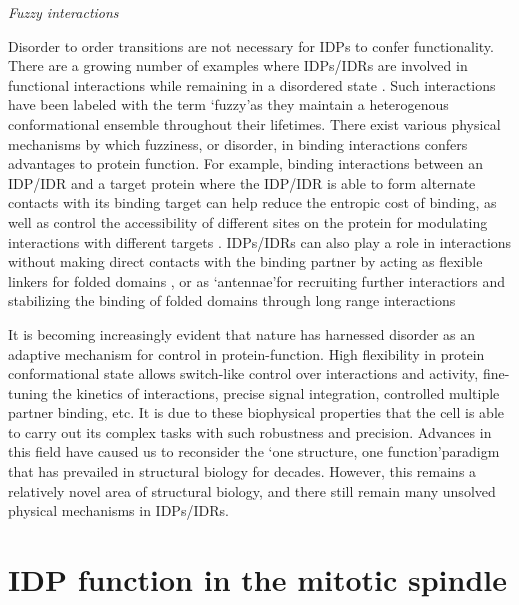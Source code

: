{\it Fuzzy interactions}

\par Disorder to order transitions are not necessary for IDPs to confer functionality. There are a growing number of examples where IDPs/IDRs are involved in functional interactions while remaining in a disordered state \cite{tompa2008fuzzy}. Such interactions have been labeled with the term \lq fuzzy\rq as they maintain a heterogenous conformational ensemble throughout their lifetimes. There exist various physical mechanisms by which fuzziness, or disorder, in binding interactions confers advantages to protein function. For example, binding interactions between an IDP/IDR and a target protein where the IDP/IDR is able to form alternate contacts with its binding target can help reduce the entropic cost of binding, as well as control the accessibility of different sites on the protein for modulating interactions with different targets \cite{graham2001tcf4, fontes2000structural}. IDPs/IDRs can also play a role in interactions without making direct contacts with the binding partner by acting as flexible linkers for folded domains \cite{bhattacharyya2006ste5}, or as \lq antennae\rq for \cite{sigalov2004homooligomerization} recruiting further interactiors and stabilizing the binding of folded domains through long range interactions \cite{zor2002roles, yu1994structural} 

It is becoming increasingly evident that nature has harnessed disorder as an adaptive mechanism for control in protein-function. High flexibility in protein conformational state allows switch-like control over interactions and activity, fine-tuning the kinetics of interactions, precise signal integration, controlled multiple partner binding, etc.  It is due to these biophysical properties that the cell is able to carry out its complex tasks with such robustness and precision. Advances in this field have caused us to reconsider the  \lq one structure, one function\rq paradigm that has prevailed in structural biology for decades. However, this remains a relatively novel area of structural biology, and there still remain many unsolved physical mechanisms in IDPs/IDRs.

\section{IDP function in the mitotic spindle}
 
